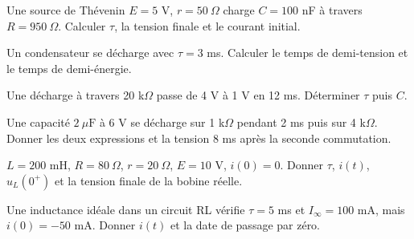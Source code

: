 \begin{questions}
\item Une source de Thévenin $E=5$ V, $r=50\ \Omega$ charge $C=100$ nF à travers $R=950\ \Omega$. Calculer $\tau$, la tension finale et le courant initial.
\end{questions}



\begin{questions}
\item Un condensateur se décharge avec $\tau=3$ ms. Calculer le temps de demi-tension et le temps de demi-énergie.
\end{questions}

\begin{questions}
\item Une décharge à travers 20 k$\Omega$ passe de 4 V à 1 V en 12 ms. Déterminer $\tau$ puis $C$.
\end{questions}

\begin{questions}
\item Une capacité $2\ \mu\mathrm{ F}$ à 6 V se décharge sur 1 k$\Omega$ pendant 2 ms puis sur 4 k$\Omega$. Donner les deux expressions et la tension 8 ms après la seconde commutation.
\end{questions}



\begin{questions}
\item $L=200$ mH, $R=80\ \Omega$, $r=20\ \Omega$, $E=10$ V, $i(0)=0$. Donner $\tau$, $i(t)$, $u_L(0^+)$ et la tension finale de la bobine réelle.
\end{questions}

\begin{questions}
\item Une inductance idéale dans un circuit RL vérifie $\tau=5$ ms et $I_\infty=100$ mA, mais $i(0)=-50$ mA. Donner $i(t)$ et la date de passage par zéro.
\end{questions}

